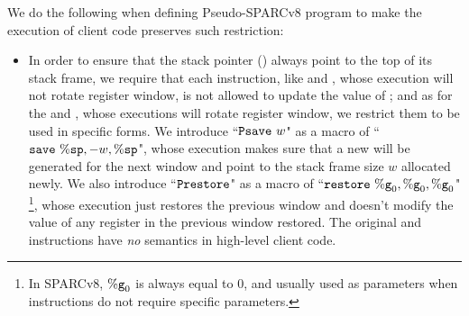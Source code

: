 We do the following when defining 
Pseudo-SPARCv8 program to make the execution 
of client code preserves such restriction:  
\begin{itemize}
    \item
    In order to ensure that 
    the stack pointer (\spreg{}) always 
    point to the top of its stack frame, we require that   
    each instruction, like \cadd{} and \ld{}, whose 
    execution will not rotate register window, 
    is not allowed to update the value of \spreg{}; 
    and as for the \csave{} and \crestore{}, whose executions 
    will rotate register window, we restrict them 
    to be used in specific forms. 
    We introduce ``$\texttt{Psave} \ w$" as a macro of 
    ``$\texttt{save}{} \ \%\texttt{sp}, -w, \%\texttt{sp}$", 
    whose execution makes sure that a new \spreg{} 
    will be generated for the next window
    and point to the stack frame size $w$ allocated newly. 
    We also introduce ``$\texttt{Prestore}$" 
    as a macro of ``$\texttt{restore}{} \ \%\texttt{g}_{0}, \%\texttt{g}_{0}, \%\texttt{g}_{0}$"
    \footnote{In SPARCv8, $\%\texttt{g}_{0}$ is always equal to 0, 
    and usually used as parameters when instructions do not 
    require specific parameters.},  
    whose execution just restores the previous window 
    and doesn't modify the value of any register 
    in the previous window restored. 
    The original \csave{} and \crestore{} instructions 
    have \textit{no} semantics in high-level client code.   
    

\end{itemize}
